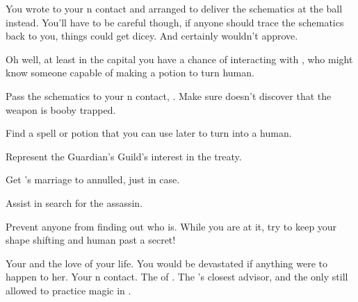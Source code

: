 \documentclass[char]{NeptuneBall}
\begin{document}
You wrote to your \pPacifica{}n contact and arranged to deliver the schematics at the ball instead. You'll have to be careful though, if anyone should trace the schematics back to you, things could get dicey. And \cQueen{} certainly wouldn't approve.

Oh well, at least in the capital you have a chance of interacting with \cManta{}, who might know someone capable of making a potion to turn \cQueen{} human.

\begin{itemz}[Goals]
  \item Pass the schematics to your \pPacifica{}n contact, \cSpy{}. Make sure \cSpy{\they} doesn't discover that the weapon is booby trapped.
  \item Find a spell or potion that you can use later to turn \cQueen{} into a human.
  \item Represent the Guardian's Guild's interest in the treaty.
  \item Get \cQueen{}'s marriage to \cKing{} annulled, just in case.
  \item Assist \cQueen{} in \cQueen{\their} search for the assassin.
  \item Prevent anyone from finding out who \cQueen{} is. While you are at it, try to keep your shape shifting and human past a secret!
\end{itemz}

\begin{contacts}
  \contact{\cQueen{}} Your \cQueen{\spouse} and the love of your life. You would be devastated if anything were to happen to her.
  \contact{\cSpy{}} Your \pPacifica{}n contact.
  \contact{\cKing{}} The \cKing{\King} of \pAtlantis{}.
  \contact{\cManta{}} The \cKing{\King}'s closest advisor, and the only \cManta{\mer} still allowed to practice magic in \pAtlantis{}.
\end{contacts}
\end{document}
